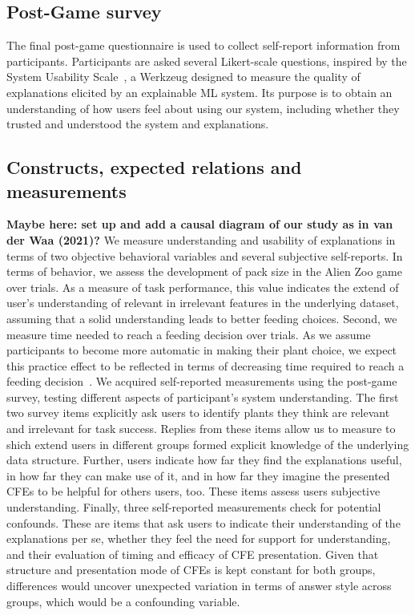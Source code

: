 \subsection{Post-Game survey}
\textcolor{ACMDarkBlue}{
The final post-game questionnaire is used to collect self-report information from participants. Participants are asked several Likert-scale questions, inspired by the System Usability Scale~\citep{holzinger_measuring_2020}, a Werkzeug designed to measure the quality of explanations elicited by an explainable ML system.
Its purpose is to obtain an understanding of how users feel about using our system, including whether they trusted and understood the system and explanations.
}

\subsection{Constructs, expected relations and measurements}

\textcolor{ACMDarkBlue}{
\textbf{Maybe here: set up and add a causal diagram of our study as in van der Waa (2021)?}
} \textcolor{ACMDarkBlue}{
We measure understanding and usability of explanations in terms of two objective behavioral variables and several subjective self-reports. 
} \textcolor{ACMDarkBlue}{
In terms of behavior, we assess the development of pack size in the Alien Zoo game over trials. 
As a measure of task performance, this value indicates the extend of user's understanding of relevant in irrelevant features in the underlying dataset, assuming that a solid understanding leads to better feeding choices. 
} \textcolor{ACMDarkBlue}{
Second, we measure time needed to reach a feeding decision over trials. As we assume participants to become more automatic in making their plant choice, we expect this practice effect to be reflected in terms of decreasing time required to reach a feeding decision~\citep{logan_shapes_1992}.
} \textcolor{ACMDarkBlue}{
We acquired self-reported measurements using the post-game survey, testing different aspects of participant’s system understanding. 
} \textcolor{ACMDarkBlue}{
The first two survey items explicitly ask users to identify plants they think are relevant and irrelevant for task success. 
Replies from these items allow us to measure to shich extend users in different groups formed explicit knowledge of the underlying data structure. 
} \textcolor{ACMDarkBlue}{
Further, users indicate how far they find the explanations useful, in how far they can make use of it, and in how far they imagine the presented \glspl{CFE} to be helpful for others users, too. These items assess users subjective understanding.
} \textcolor{ACMDarkBlue}{
Finally, three self-reported measurements check for potential confounds. 
These are items that ask users to indicate their understanding of the explanations per se, whether they feel the need for support for understanding, and their evaluation of timing and efficacy of \gls{CFE} presentation.
Given that structure and presentation mode of \glspl{CFE} is kept constant for both groups, differences would uncover unexpected variation in terms of answer style across groups, which would be a confounding variable. 
}

